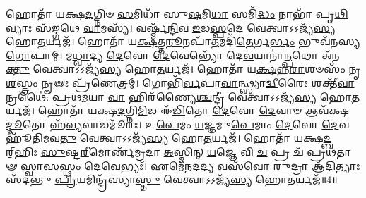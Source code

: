 𑌹𑍋𑌤𑌾᳴ 𑌯𑌕𑍍𑌷\-\ul{𑌦}\-𑌗𑍍𑌨𑌿𑍞 \ul{𑌸}\-𑌮𑌿𑌧𑌾᳴ 𑌸𑍁\-\ul{𑌷}\-𑌮𑌿\-\ul{𑌧𑌾} 𑌸𑌮𑌿᳴\-\ul{𑌦𑍍𑌧𑌂} 𑌨𑌾𑌭𑌾᳴ 𑌪𑍃\-\ul{𑌥𑌿}\-𑌵𑍍𑌯𑌾𑌃 𑌸᳴\-\ul{𑌙𑍍𑌗}\-𑌥𑍇 \ul{𑌵𑌾}\-𑌮𑌸𑍍𑌯᳴।
𑌵𑌰𑍍𑌷𑍍𑌮᳴\-\ul{𑌨𑍍𑌦𑌿}\-𑌵 \ul{𑌇}\-𑌡\-\ul{𑌸𑍍𑌪}\-𑌦𑍇 𑌵𑍇𑌤𑍍𑌵𑌾𑌽𑌽𑌜𑍍𑌯᳴\-\ul{𑌸𑍍𑌯} 𑌹𑍋\-\ul{𑌤}\-𑌰𑍍𑌯𑌜᳴।
𑌹𑍋𑌤𑌾᳴ 𑌯\-\ul{𑌕𑍍𑌷}\-𑌤𑍍𑌤\-\ul{𑌨𑍂}\-𑌨𑌪𑌾᳴\-\ul{𑌤}\-𑌮𑌦𑌿᳴\-\ul{𑌤𑍇}\-𑌰𑍍𑌗\-\ul{𑌰𑍍𑌭𑌂} 𑌭𑍁𑌵᳴𑌨𑌸𑍍𑌯 \ul{𑌗𑍋}\-𑌪𑌾𑌮𑍍।
𑌮\-\ul{𑌧𑍍𑌵𑌾}\-𑌦𑍍𑌯 \ul{𑌦𑍇}\-𑌵𑍋 \ul{𑌦𑍇}\-𑌵𑍇𑌭𑍍𑌯𑍋᳴ 𑌦𑍇\-\ul{𑌵}\-𑌯𑌾𑌨𑌾॑\-\ul{𑌨𑍍𑌪}\-𑌥𑍋 𑌅᳴𑌨\-\ul{𑌕𑍍𑌤𑍁} 𑌵𑍇𑌤𑍍𑌵𑌾𑌽𑌽𑌜𑍍𑌯᳴\-\ul{𑌸𑍍𑌯} 𑌹𑍋\-\ul{𑌤}\-𑌰𑍍𑌯𑌜᳴।
𑌹𑍋𑌤𑌾᳴ 𑌯\-\ul{𑌕𑍍𑌷}\-𑌨𑍍𑌨\-\ul{𑌰𑌾}\-𑌶𑍞𑌸𑌂᳴ 𑌨𑍃\-\ul{𑌶}\-𑌸𑍍𑌤𑍍𑌰𑌂 𑌨𑍄𑍟𑌃 𑌪𑍍𑌰᳴𑌣𑍇𑌤𑍍𑌰𑌮𑍍।
𑌗𑍋𑌭𑌿᳴\-\ul{𑌰𑍍𑌵}\-𑌪𑌾\-\ul{𑌵𑌾}\-𑌨𑍍𑌥𑍍𑌸𑍍𑌯𑌾\-\ul{𑌦𑍍𑌵𑍀}\-𑌰𑍈𑌃 𑌶𑌕𑍍𑌤𑍀᳴\-\ul{𑌵𑌾}\-𑌨𑍍𑌰𑌥𑍈॑: 𑌪𑍍𑌰𑌥\-\ul{𑌮}\-𑌯𑌾 \ul{𑌵𑌾} 𑌹𑌿𑌰᳴𑌣𑍍𑌯𑍈\-\ul{𑌶𑍍𑌚}\-𑌨𑍍𑌦𑍍𑌰𑍀 𑌵𑍇𑌤𑍍𑌵𑌾𑌽𑌽𑌜𑍍𑌯᳴\-\ul{𑌸𑍍𑌯} 𑌹𑍋\-\ul{𑌤}\-𑌰𑍍𑌯𑌜᳴।
𑌹𑍋𑌤𑌾᳴ 𑌯𑌕𑍍𑌷\-\ul{𑌦}\-𑌗𑍍𑌨𑌿\-\ul{𑌮𑌿}\-𑌡 𑌈᳴\-\ul{𑌡𑌿}\-𑌤𑍋 \ul{𑌦𑍇}\-𑌵𑍋 \ul{𑌦𑍇}\-𑌵𑌾𑍞 𑌆𑌵᳴𑌕𑍍𑌷\-\ul{𑌦𑍍𑌦𑍂}\-𑌤𑍋 𑌹᳴\-\ul{𑌵𑍍𑌯}\-𑌵𑌾𑌡𑌮𑍂᳴𑌰𑌃।
𑌉\-\ul{𑌪𑍇}\-𑌮𑌂 \ul{𑌯}\-𑌜𑍍𑌞𑌮𑍁\-\ul{𑌪𑍇}\-𑌮𑌾𑌂 \ul{𑌦𑍇}\-𑌵𑍋 \ul{𑌦𑍇}\-𑌵𑌹𑍂᳴𑌤𑌿𑌮𑌵\-\ul{𑌤𑍁} 𑌵𑍇𑌤𑍍𑌵𑌾𑌽𑌽𑌜𑍍𑌯᳴\-\ul{𑌸𑍍𑌯} 𑌹𑍋\-\ul{𑌤}\-𑌰𑍍𑌯𑌜᳴।
𑌹𑍋𑌤𑌾᳴ 𑌯𑌕𑍍𑌷\-\ul{𑌦𑍍𑌬}\-𑌰𑍍‌॒\mbox{}𑌹𑌿𑌃 \ul{𑌸𑍁}\-𑌷𑍍𑌟\-\ul{𑌰𑍀}\-𑌮𑍋𑌰𑍍𑌣᳴𑌮𑍍𑌰𑌦𑌾 \ul{𑌅}\-𑌸𑍍𑌮𑌿𑌨𑍍 \ul{𑌯}\-𑌜𑍍𑌞𑍇 𑌵𑌿 \ul{𑌚} 𑌪𑍍𑌰 𑌚᳴ 𑌪𑍍𑌰𑌥𑌤𑌾𑍟 𑌸𑍍𑌵𑌾\-\ul{𑌸}\-𑌸𑍍𑌥𑌂 \ul{𑌦𑍇}\-𑌵𑍇𑌭𑍍𑌯𑌃᳴।
𑌏𑌮𑍇᳴𑌨\-\ul{𑌦}\-𑌦𑍍𑌯 𑌵𑌸᳴𑌵𑍋 \ul{𑌰𑍁}\-𑌦𑍍𑌰𑌾 𑌆᳴\-\ul{𑌦𑌿}\-𑌤𑍍𑌯𑌾𑌃 𑌸᳴𑌦𑌨𑍍𑌤𑍁 \ul{𑌪𑍍𑌰𑌿}\-𑌯𑌮𑌿𑌨𑍍𑌦𑍍𑌰᳴𑌸𑍍𑌯𑌾\-\ul{𑌸𑍍𑌤𑍁} 𑌵𑍇𑌤𑍍𑌵𑌾𑌽𑌽𑌜𑍍𑌯᳴\-\ul{𑌸𑍍𑌯} 𑌹𑍋\-\ul{𑌤}\-𑌰𑍍𑌯𑌜᳴॥4॥

